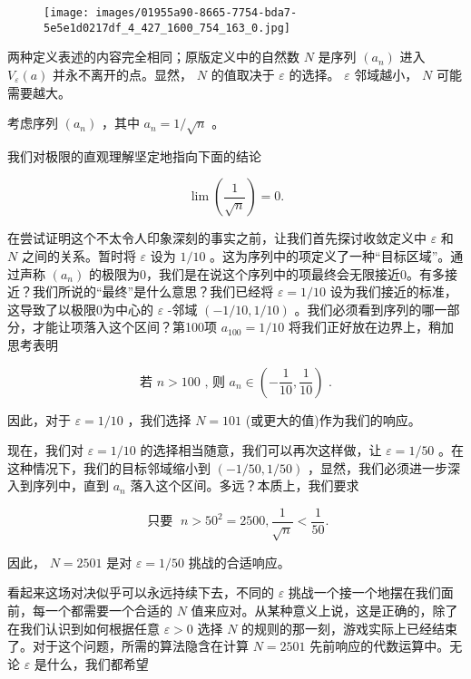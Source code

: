 \begin{figure}[h]
  \centering
  \texttt{[image: images/01955a90-8665-7754-bda7-5e5e1d0217df\_4\_427\_1600\_754\_163\_0.jpg]}
\end{figure}

\addtocounter{Thm}{1}

两种定义表述的内容完全相同；原版定义中的自然数 \(N\) 是序列 \(\left( {a}_{n}\right)\) 进入 \({V}_{\varepsilon }\left( a\right)\) 并永不离开的点。显然， \(N\) 的值取决于 \(\varepsilon\) 的选择。 \(\varepsilon\) 邻域越小， \(N\) 可能需要越大。

\begin{Eg}
  \label{eg:2.2.5}
考虑序列 \(\left( {a}_{n}\right)\) ，其中 \({a}_{n} = 1/\sqrt{n}\) 。

我们对极限的直观理解坚定地指向下面的结论

\[
\lim \left( \frac{1}{\sqrt{n}}\right)  = 0.
\]

在尝试证明这个不太令人印象深刻的事实之前，让我们首先探讨收敛定义中 \(\varepsilon\) 和 \(N\) 之间的关系。暂时将 \(\varepsilon\) 设为 \(1/{10}\) 。这为序列中的项定义了一种“目标区域”。通过声称 \(\left( {a}_{n}\right)\) 的极限为0，我们是在说这个序列中的项最终会无限接近0。有多接近？我们所说的“最终”是什么意思？我们已经将 \(\varepsilon  = 1/{10}\) 设为我们接近的标准，这导致了以极限0为中心的 \(\varepsilon\) -邻域 \(\left( {-1/{10},1/{10}}\right)\) 。我们必须看到序列的哪一部分，才能让项落入这个区间？第100项 \({a}_{100} = 1/{10}\) 将我们正好放在边界上，稍加思考表明

\[
\text{ 若 }n > {100}\text{ , 则 }{a}_{n} \in  \left( {-\frac{1}{10},\frac{1}{10}}\right) \text{ . }
\]

因此，对于 \(\varepsilon  = 1/{10}\) ，我们选择 \(N = {101}\) (或更大的值)作为我们的响应。

现在，我们对 \(\varepsilon  = 1/{10}\) 的选择相当随意，我们可以再次这样做，让 \(\varepsilon  = 1/{50}\) 。在这种情况下，我们的目标邻域缩小到 \(\left( {-1/{50},1/{50}}\right)\) ，显然，我们必须进一步深入到序列中，直到 \({a}_{n}\) 落入这个区间。多远？本质上，我们要求

\[
\text{ 只要 }\;n > {50}^{2} = {2500}, \frac{1}{\sqrt{n}} < \frac{1}{50}.
\]

因此， \(N = {2501}\) 是对 \(\varepsilon  = 1/{50}\) 挑战的合适响应。

看起来这场对决似乎可以永远持续下去，不同的 \(\varepsilon\) 挑战一个接一个地摆在我们面前，每一个都需要一个合适的 \(N\) 值来应对。从某种意义上说，这是正确的，除了在我们认识到如何根据任意 \(\varepsilon  > 0\) 选择 \(N\) 的规则的那一刻，游戏实际上已经结束了。对于这个问题，所需的算法隐含在计算 \(N = {2501}\) 先前响应的代数运算中。无论 \(\varepsilon\) 是什么，我们都希望


\end{Eg}
